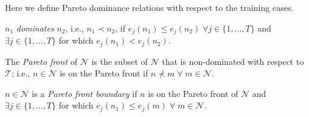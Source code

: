 \documentclass[preprint]{article}
\begin{document}
Here we define Pareto dominance relations with respect to the training cases. 

\medskip
{} $n_1$ {\it dominates} $n_2$, i.e., ${n_1} \prec {n_2}$, if $e_j(n_1) \leq e_j(n_2) \;
\forall j  \in \{1,\dots,T\}$ and $\exists j \in \{1,\dots,T\}$ for which $e_j(n_1) < e_j(n_2)$. \bigskip
\bigskip

\medskip
{} The {\it Pareto front} of $\mathcal{N}$ is the subset of $\mathcal{N}$ that is non-dominated with respect to $\mathcal{T}$; i.e., $n \in \mathcal{N}$ is on the Pareto front if $n \nprec m \; \forall \; m \in \mathcal{N}$. 
\bigskip

\medskip
{} $n \in \mathcal{N}$ is a {\it Pareto front boundary} if $n$ is on the Pareto front of $\mathcal{N}$ and $\exists j \in \{1,\dots,T\}$ for which $e_j(n_1) \leq e_j(m) \; \forall \; m \in \mathcal{N}$. \bigskip
\bigskip
\end{document}
